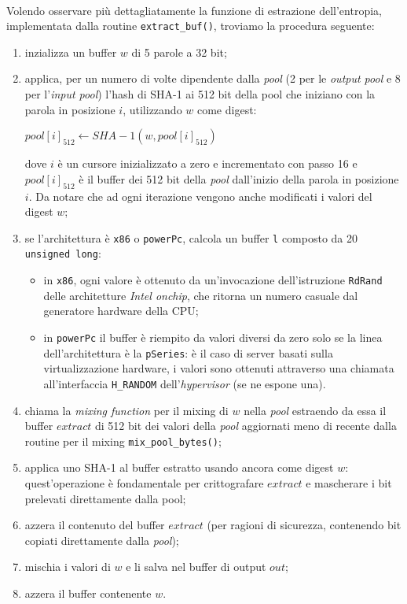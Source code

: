 \documentclass{article}
\begin{document}
 \paragraph{} Volendo osservare più dettagliatamente la funzione di estrazione
 dell'entropia, implementata dalla routine
 \verb+extract_buf()+, troviamo la procedura seguente:
 \begin{enumerate}
   \item inzializza un buffer $w$ di 5 parole a 32 bit;
   \item applica, per un numero di volte dipendente dalla \emph{pool} (2 per le
   \emph{output pool} e 8 per l'\emph{input pool})  l'hash di SHA-1 ai 512 bit
   della pool che iniziano con la parola in posizione $i$, utilizzando $w$ come
   digest:
   \begin{center}
   $pool\left[i\right]_{512}\leftarrow SHA-1(w, pool\left[i\right]_{512})$
   \end{center}
   dove $i$ è un cursore inizializzato a zero e incrementato con passo 16 e
   $pool\left[i\right]_{512}$ è il buffer dei 512 bit della \emph{pool}
   dall'inizio della parola in posizione $i$. Da notare che ad ogni iterazione
   vengono anche modificati i valori del digest $w$; 
   \item se l'architettura è \verb+x86+ o \verb+powerPc+, calcola un buffer
   \verb+l+ composto da 20 \verb+unsigned long+:
   \begin{itemize}
     \item in \verb+x86+, ogni valore è ottenuto da un'invocazione
     dell'istruzione \verb+RdRand+ delle architetture \emph{Intel onchip}, che
     ritorna un numero casuale dal generatore hardware della CPU;
     \item in \verb+powerPc+ il buffer è riempito da valori diversi da zero 
     solo se la linea dell'architettura è la \verb+pSeries+: è il
     caso di server basati sulla virtualizzazione hardware, i valori sono
     ottenuti attraverso una chiamata all'interfaccia \verb+H_RANDOM+
     dell'\emph{hypervisor} (se ne espone una).
   \end{itemize} 
   \item chiama la \emph{mixing function} per il mixing di $w$ nella
   \emph{pool} estraendo da essa il buffer $extract$ di 512 bit dei valori
   della \emph{pool} aggiornati meno di recente dalla routine per il mixing
   \verb+mix_pool_bytes()+;
   \item applica uno SHA-1 al buffer estratto usando ancora come digest $w$:
   quest'operazione è fondamentale per crittografare $extract$ e mascherare i
   bit prelevati direttamente dalla pool;
   \item azzera il contenuto del buffer $extract$ (per ragioni di sicurezza,
   contenendo bit copiati direttamente dalla \emph{pool});
   \item mischia i valori di $w$ e li salva nel buffer di output $out$;
   \item azzera il buffer contenente $w$.
 \end{enumerate}
 
\end{document}
